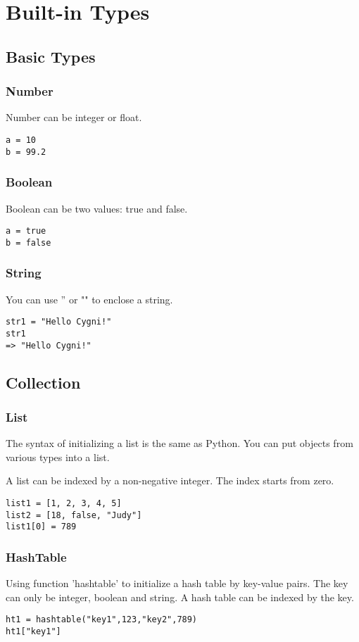 \chapter{Built-in Types}
\section{Basic Types}
\subsection{Number}
	Number can be integer or float.
\begin{lstlisting}
a = 10
b = 99.2
\end{lstlisting}

\subsection{Boolean}
	Boolean can be two values: true and false.
\begin{lstlisting}
a = true
b = false
\end{lstlisting}

\subsection{String}
	You can use '' or "" to enclose a string.
\begin{lstlisting}
str1 = "Hello Cygni!"
str1
=> "Hello Cygni!"
\end{lstlisting}

\section{Collection}
\subsection{List}
The syntax of initializing a list is the same as Python. You can put objects from various types into a list.

A list can be indexed by a non-negative integer. The index starts from zero.
\begin{lstlisting}
list1 = [1, 2, 3, 4, 5]
list2 = [18, false, "Judy"]
list1[0] = 789
\end{lstlisting}

\subsection{HashTable}
Using function 'hashtable' to initialize a hash table by key-value pairs. The key can only be integer, boolean and string.
A hash table can be indexed by the key.
\begin{lstlisting}
ht1 = hashtable("key1",123,"key2",789)
ht1["key1"]
\end{lstlisting}

